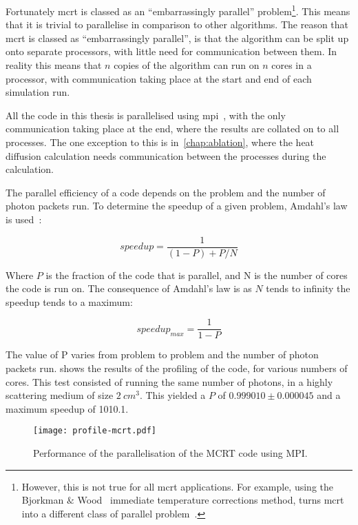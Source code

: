 Fortunately \gls*{mcrt} is classed as an ``embarrassingly parallel'' problem\footnote{However, this is not true for all \gls*{mcrt} applications. For example, using the Bjorkman $\&$ Wood~\cite{bjorkman2001radiative} immediate temperature corrections method, turns \gls*{mcrt} into a different class of parallel problem~\cite{robitaille2011hyperion}.}.
This means that it is trivial to parallelise in comparison to other algorithms. 
The reason that \gls*{mcrt} is classed as ``embarrassingly parallel'', is that the algorithm can be split up onto separate processors, with little need for communication between them. 
In reality this means that $n$ copies of the algorithm can run on $n$ cores in a processor, with communication taking place at the start and end of each simulation run. 

All the code in this thesis is parallelised using \gls*{mpi}~\cite{gropp2014using,gropp2014usingadv}, with the only communication taking place at the end, where the results are collated on to all processes.
The one exception to this is in~\cref{chap:ablation}, where the heat diffusion calculation needs communication between the processes during the calculation.

The parallel efficiency of a code depends on the problem and the number of photon packets run.
To determine the speedup of a given problem, Amdahl's law is used~\cite{amdahl1967validity}:

\begin{equation}
speedup = \frac{1}{(1-P)+P/N}
\end{equation}

Where $P$ is the fraction of the code that is parallel, and N is the number of cores the code is run on.
The consequence of Amdahl's law is as $N$ tends to infinity the speedup tends to a maximum:

\begin{equation}
speedup_{max}=\frac{1}{1-P}
\end{equation}

The value of P varies from problem to problem and the number of photon packets run.
 shows the results of the profiling of the code, for various numbers of cores.
This test consisted of running the same number of photons, in a highly scattering medium of size $2~cm^3$.
This yielded a $P$ of $0.999010 \pm 0.000045$ and a maximum speedup of 1010.1.


\begin{figure}[!htbp]
	\centering
	\texttt{[image: profile-mcrt.pdf]}
	\caption{Performance of the parallelisation of the MCRT code using MPI.}
	\label{fig:paratest}
\end{figure}


